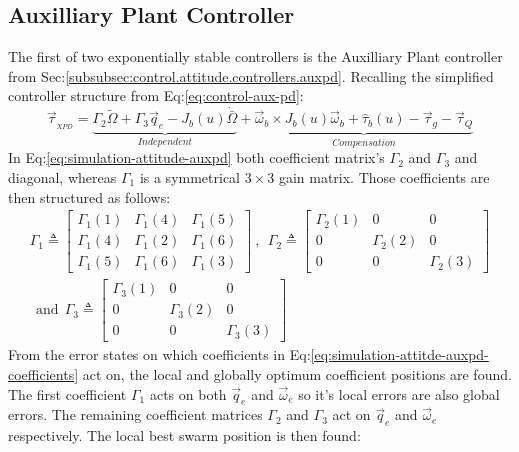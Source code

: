 \subsection{Auxilliary Plant Controller}
\label{subsec:simulation.attitude.xpd}
The first of two exponentially stable controllers is the Auxilliary Plant controller from Sec:\ref{subsubsec:control.attitude.controllers.auxpd}. Recalling the simplified controller structure from Eq:\ref{eq:control-aux-pd}:
\begin{equation}\label{eq:simulation-attitude-auxpd}
\vec{\tau}_{_{XPD}}=\underbrace{\Gamma_2{\widetilde{\Omega}}+\Gamma_3\vec{q}_e-J_b(u)\dot{\bar{\Omega}}}_{Independent}+\underbrace{\vec{\omega}_b\times J_b(u)\vec{\omega}_b+\hat{\tau}_b(u)-\vec{\tau}_g-\vec{\tau}_Q}_{Compensation}
\end{equation}
In Eq:\ref{eq:simulation-attitude-auxpd} both coefficient matrix's $\Gamma_2$ and $\Gamma_3$ and diagonal, whereas $\Gamma_1$ is a symmetrical $3\times 3$ gain matrix. Those coefficients are then structured as follows:
\begin{multline}\label{eq:simulation-attitde-auxpd-coefficients}
\Gamma_1\triangleq \begin{bmatrix}
\Gamma_1(1) & \Gamma_1(4) & \Gamma_1(5)\\
\Gamma_1(4) & \Gamma_1(2) & \Gamma_1(6)\\
\Gamma_1(5) & \Gamma_1(6) & \Gamma_1(3)
\end{bmatrix}~,~~
\Gamma_2\triangleq \begin{bmatrix}
\Gamma_2(1) & 0 & 0\\
0 &\Gamma_2(2) & 0\\
0 & 0 & \Gamma_2(3)
\end{bmatrix}
\\
~~\text{and}~~\Gamma_3\triangleq \begin{bmatrix}
\Gamma_3(1) & 0 & 0\\
0 & \Gamma_3(2) & 0\\
0 & 0 & \Gamma_3(3)
\end{bmatrix}
\end{multline}
From the error states on which coefficients in Eq:\ref{eq:simulation-attitde-auxpd-coefficients} act on, the local and globally optimum coefficient positions are found. The first coefficient $\Gamma_1$ acts on both $\vec{q}_e$ and $\vec{\omega}_e$ so it's local errors are also global errors. The remaining coefficient matrices $\Gamma_2$ and $\Gamma_3$ act on $\vec{q}_e$ and $\vec{\omega}_e$ respectively. The local best swarm position is then found:
